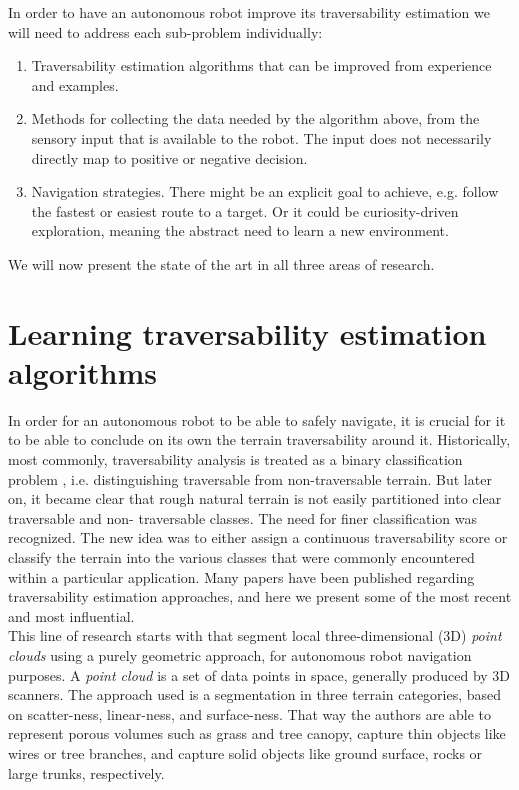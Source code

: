 \documentclass[12pt,a4paper,table,dvipsnames,tikz]{report}
\newcommand{\term}{\textit}
\newcommand{\acronym}{\MakeUppercase}
\begin{document}
	In order to have an autonomous robot improve its traversability 
	estimation we will need to address each sub-problem individually:
	
	\begin{enumerate}
		\item Traversability estimation algorithms that can be improved from 
		experience and examples.
		\item Methods for collecting the data needed by the algorithm above, from 
		the sensory input that is available to the robot. The input does not necessarily 
		directly map to positive or negative decision.
		\item Navigation strategies. There might be an explicit goal to achieve, e.g.
		follow the fastest or easiest route to a target. Or it could be curiosity-driven 
		exploration, meaning the abstract need to learn a new environment.
	\end{enumerate}
	
	We will now present the state of the art in all three areas of research.
	\\
	
	\section{Learning traversability estimation algorithms}
	\label{sec:bg:trav}
	
	In order for an autonomous robot to be able to safely navigate, it is crucial 
	for it to be able to conclude on its own the terrain traversability 
	around it. Historically, most commonly, traversability analysis is 
	treated as a binary classification problem \citep{Papadakis}, i.e. distinguishing 
	traversable from non-traversable terrain. But later on, it became clear that 
	rough natural terrain is not easily partitioned into clear traversable and non-
	traversable classes. The need for finer classification was recognized. The new 
	idea was to either assign a continuous traversability score or classify 
	the terrain into the various classes that were commonly encountered within a 
	particular application. Many papers have been published regarding 
	traversability estimation approaches, and here we present some of the 
	most recent and most influential.
	\\
	
	This line of research starts with \citet{Lalonde} that segment local 
	three-dimensional (\acronym{3d}) \term{point clouds} using a purely geometric 
	approach, for autonomous robot navigation purposes. A 
	\term{point cloud} is a set of data points in space, generally produced by 
	\acronym{3d} scanners. The approach used is a segmentation in three terrain 
	categories, based on scatter-ness, linear-ness, and surface-ness. That way 
	the authors are able to represent porous volumes such as grass and tree canopy, 
	capture thin objects like wires or tree branches, and capture solid objects 
	like ground surface, rocks or large trunks, respectively.
	\\	
	
\end{document}
